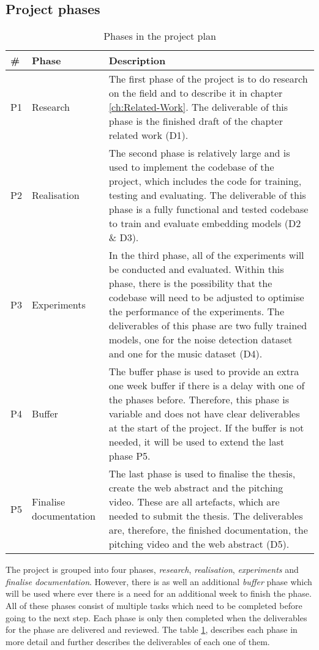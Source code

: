 \subsection{Project phases}
\label{sec:Project-Phases}
\begin{table}[htb]
    \centering
    \caption{Phases in the project plan}
	\label{tab:Phases}
    \begin{tabular}{p{} | p{} | p{}}
        \toprule
        \textbf{\#} & \textbf{Phase} & \textbf{Description} \\ 
        \midrule[1pt]
        P1 & Research & The first phase of the project is to do research on the field and to describe it in chapter \ref{ch:Related-Work}. The deliverable of this phase is the finished draft of the chapter related work (D1). \\
        \hline
        P2 & Realisation & The second phase is relatively large and is used to implement the codebase of the project, which includes the code for training, testing and evaluating. The deliverable of this phase is a fully functional and tested codebase to train and evaluate embedding models (D2 \& D3).\\
        \hline
        P3 & Experiments & In the third phase, all of the experiments will be conducted and evaluated. Within this phase, there is the possibility that the codebase will need to be adjusted to optimise the performance of the experiments. The deliverables of this phase are two fully trained models, one for the noise detection dataset and one for the music dataset (D4).\\
        \hline
        P4 & Buffer & The buffer phase is used to provide an extra one week buffer if there is a  delay with one of the phases before. Therefore, this phase is variable and does not have clear deliverables at the start of the project. If the buffer is not needed, it will be used to extend the last phase P5. \\
        \hline
        P5 & Finalise documentation & The last phase is used to finalise the thesis, create the web abstract and the pitching video. These are all artefacts, which are needed to submit the thesis. The deliverables are, therefore, the finished documentation, the pitching video and the web abstract (D5). \\
        \bottomrule
    \end{tabular}
\end{table}
\noindent
The project is grouped into four phases, \textit{research}, \textit{realisation}, \textit{experiments} and \textit{finalise documentation}. However, there is as well an additional \textit{buffer} phase which will be used where ever there is a need for an additional week to finish the phase. All of these phases consist of multiple tasks which need to be completed before going to the next step. Each phase is only then completed when the deliverables for the phase are delivered and reviewed. The table \ref{tab:Phases}, describes each phase in more detail and further describes the deliverables of each one of them.

